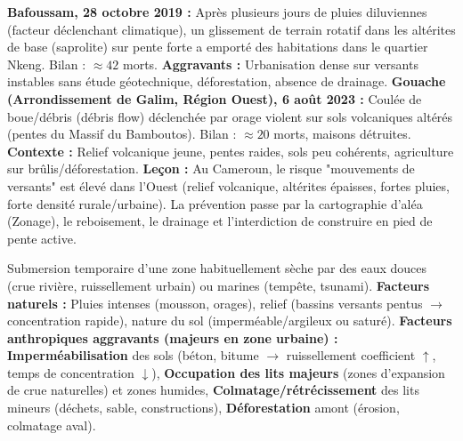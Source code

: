 \documentclass[11pt]{article}
\begin{document}
\begin{exemplebox}
\textbf{Bafoussam, 28 octobre 2019 :} Après plusieurs jours de pluies diluviennes (facteur déclenchant climatique), un glissement de terrain rotatif dans les altérites de base (saprolite) sur pente forte a emporté des habitations dans le quartier Nkeng. Bilan : $\approx 42$ morts. \textbf{Aggravants :} Urbanisation dense sur versants instables sans étude géotechnique, déforestation, absence de drainage.
\textbf{Gouache (Arrondissement de Galim, Région Ouest), 6 août 2023 :} Coulée de boue/débris (débris flow) déclenchée par orage violent sur sols volcaniques altérés (pentes du Massif du Bamboutos). Bilan : $\approx 20$ morts, maisons détruites. \textbf{Contexte :} Relief volcanique jeune, pentes raides, sols peu cohérents, agriculture sur brûlis/déforestation.
\textbf{Leçon :} Au Cameroun, le risque "mouvements de versants" est élevé dans l'Ouest (relief volcanique, altérites épaisses, fortes pluies, forte densité rurale/urbaine). La prévention passe par la cartographie d'aléa (Zonage), le reboisement, le drainage et l'interdiction de construire en pied de pente active.
\end{exemplebox}

\begin{definition}[Inondation]
Submersion temporaire d'une zone habituellement sèche par des eaux douces (crue rivière, ruissellement urbain) ou marines (tempête, tsunami).
\textbf{Facteurs naturels :} Pluies intenses (mousson, orages), relief (bassins versants pentus $\rightarrow$ concentration rapide), nature du sol (imperméable/argileux ou saturé).
\textbf{Facteurs anthropiques aggravants (majeurs en zone urbaine) :} \textbf{Imperméabilisation} des sols (béton, bitume $\rightarrow$ ruissellement coefficient $\uparrow$, temps de concentration $\downarrow$), \textbf{Occupation des lits majeurs} (zones d'expansion de crue naturelles) et zones humides, \textbf{Colmatage/rétrécissement} des lits mineurs (déchets, sable, constructions), \textbf{Déforestation} amont (érosion, colmatage aval).
\end{definition}
\end{document}
